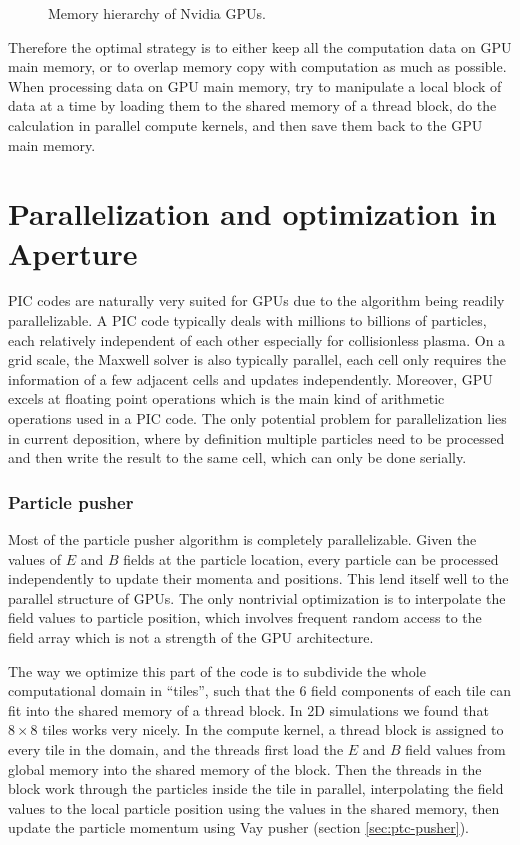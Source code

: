 \begin{figure}[h]
  \centering

  \caption[Memory hierarchy of Nvidia GPUs.]{Memory hierarchy of Nvidia GPUs.}
  \label{fig:gpu-memory}
\end{figure}

Therefore the optimal strategy is to either keep all the computation data on GPU
main memory, or to overlap memory copy with computation as much as possible.
When processing data on GPU main memory, try to manipulate a local block of data
at a time by loading them to the shared memory of a thread block, do the
calculation in parallel compute kernels, and then save them back to the GPU main
memory.

\section{Parallelization and optimization in Aperture}
\label{sec:optimization}

PIC codes are naturally very suited for GPUs due to the algorithm being readily
parallelizable. A PIC code typically deals with millions to billions of
particles, each relatively independent of each other especially for
collisionless plasma. On a grid scale, the Maxwell solver is also typically
parallel, each cell only requires the information of a few adjacent cells and
updates independently. Moreover, GPU excels at floating point operations which
is the main kind of arithmetic operations used in a PIC code. The only
potential problem for parallelization lies in current deposition, where by
definition multiple particles need to be processed and then write the result to
the same cell, which can only be done serially.

\subsubsection{Particle pusher}
\label{sec:gpu-pusher}

Most of the particle pusher algorithm is completely parallelizable. Given the
values of $E$ and $B$ fields at the particle location, every particle can be
processed independently to update their momenta and positions. This lend itself
well to the parallel structure of GPUs. The only nontrivial optimization is to
interpolate the field values to particle position, which involves frequent random
access to the field array which is not a strength of the GPU architecture.

The way we optimize this part of the code is to subdivide the whole
computational domain in ``tiles'', such that the 6 field components of each tile
can fit into the shared memory of a thread block. In 2D simulations we found
that $8\times 8$ tiles works very nicely. In the compute kernel, a thread block
is assigned to every tile in the domain, and the threads first load the $E$ and
$B$ field values from global memory into the shared memory of the block. Then
the threads in the block work through the particles inside the tile in parallel,
interpolating the field values to the local particle position using the values
in the shared memory, then update the particle momentum using Vay pusher
(section \ref{sec:ptc-pusher}).

